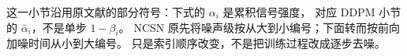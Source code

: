 这一小节沿用原文献的部分符号：下式的 $\alpha_i$ 是累积信号强度，
对应 DDPM 小节的 $\bar\alpha_i$，不是单步 $1-\beta_i$。
NCSN 原先将噪声级按从大到小编号；下面转而按前向加噪时间从小到大编号。
只是索引顺序改变，不是把训练过程改成逐步去噪。
